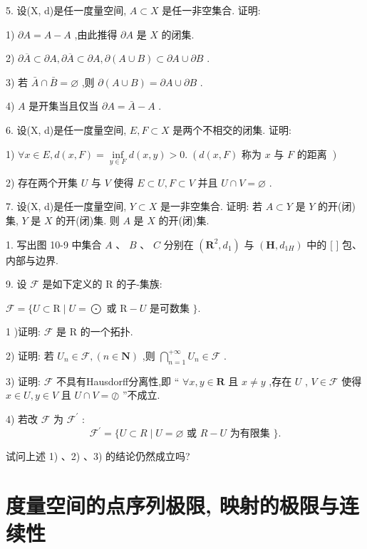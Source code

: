 5. 设(X, d)是任一度量空间, $A \subset  X$ 是任一非空集合. 证明:

1) $\partial A = A - A$ ,由此推得 $\partial A$ 是 $X$ 的闭集.

2) $\partial \overline{A} \subset  \partial A,\partial \overline{A} \subset  \partial A,\partial \left( {A \cup  B}\right)  \subset  \partial A \cup  \partial B$ .

3) 若 $\bar{A} \cap  \bar{B} = \varnothing$ ,则 $\partial \left( {A \cup  B}\right)  = \partial A \cup  \partial B$ .

4) $A$ 是开集当且仅当 $\partial A = \bar{A} - A$ .

6. 设(X, d)是任一度量空间, $E,F \subset  X$ 是两个不相交的闭集. 证明:

1) $\forall x \in  E,d\left( {x,F}\right)  = \mathop{\inf }\limits_{{y \in  F}}d\left( {x,y}\right)  > 0.\;\left( {d\left( {x,F}\right) \text{ 称为 }x\text{ 与 }F\text{ 的距离 }}\right)$

2) 存在两个开集 $U$ 与 $V$ 使得 $E \subset  U,F \subset  V$ 并且 $U \cap  V = \varnothing$ .

7. 设(X, d)是任一度量空间, $Y \subset  X$ 是一非空集合. 证明: 若 $A \subset  Y$ 是 $Y$ 的开(闭)集, $Y$ 是 $X$ 的开(闭)集. 则 $A$ 是 $X$ 的开(闭)集.

1. 写出图 10-9 中集合 $A$ 、 $B$ 、 $C$ 分别在 $\left( {{\mathbf{R}}^{2},{d}_{1}}\right)$ 与 $\left( {\mathbf{H},{d}_{1H}}\right)$ 中的 [ ] 包、内部与边界.

9. 设 $\mathcal{F}$ 是如下定义的 $\mathrm{R}$ 的子-集族:

$\mathcal{F} = \{ U \subset  \mathrm{R} \mid  U = \bigodot$ 或 $\mathrm{R} - U$ 是可数集 $\} .$

1 )证明: $\mathcal{F}$ 是 $\mathrm{R}$ 的一个拓扑.

2) 证明: 若 ${U}_{n} \in  \mathcal{F},\left( {n \in  \mathbf{N}}\right)$ ,则 $\mathop{\bigcap }\limits_{{n = 1}}^{{+\infty }}{U}_{n} \in  \mathcal{F}$ .

3) 证明: $\mathcal{F}$ 不具有Hausdorff分离性,即 “ $\forall x,y \in  \mathbf{R}$ 且 $x \neq  y$ ,存在 $U$ , $V \in  \mathcal{F}$ 使得 $x \in  U,y \in  V$ 且 $U \cap  V =  \oslash$ ”不成立.

4) 若改 $\mathcal{F}$ 为 ${\mathcal{F}}^{\prime }$ :
$${\mathcal{F}}^{\prime } = \{ U \subset  R \mid  U = \varnothing \text{ 或 }R - U\text{ 为有限集 }\} .$$

试问上述 1) 、2) 、3) 的结论仍然成立吗?

\section{度量空间的点序列极限, 映射的极限与连续性}

